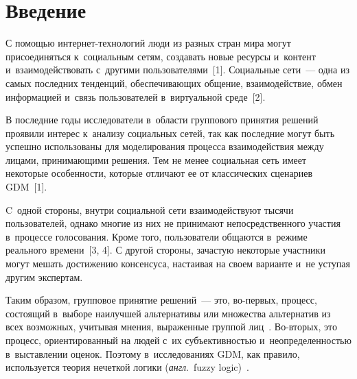 
  
\vspace*{2pt}



\thispagestyle{headings}

\begin{multicols}{2}

\label{st\stat}

\section{Введение}

  С помощью интернет-технологий люди из разных стран мира могут 
присоединяться к~социальным сетям, создавать новые ресурсы и~контент\linebreak 
и~взаимодействовать с~другими пользователями~[1]. Социальные сети~--- одна 
из самых последних тенденций, обеспечивающих общение, взаимодействие, 
обмен информацией и~связь пользователей в~виртуальной среде~[2]. 
  
  В последние годы исследователи в~области группового принятия решений 
 проявили интерес к~анализу социальных 
сетей, так как последние могут быть успешно использованы для моделирования 
процесса взаимодействия между лицами, принимающими решения. Тем не 
менее социальная сеть имеет некоторые особенности, которые отличают ее от 
классических сценариев GDM~[1].

 C~одной стороны, внутри социальной сети 
взаимодействуют тысячи пользователей, однако многие из них не принимают 
непосредственного участия в~процессе голосования. Кроме того, пользователи 
общаются в~режиме реального времени~[3, 4]. С другой стороны, зачастую 
некоторые участники могут мешать достижению консенсуса, настаивая на 
своем варианте и~не уступая другим экспертам. 

Таким образом, групповое 
принятие решений~--- это, во-пер\-вых, процесс, состоящий в~выборе 
наилучшей альтернативы или множества альтернатив из всех возможных, 
учитывая мнения, выраженные группой лиц~\cite{3-gai, 5-gai}. Во-вто\-рых, это 
процесс, ориентированный на людей с~их субъективностью 
и~неопределенностью в~выставлении оценок. Поэтому в~исследованиях GDM, 
как правило, используется теория нечеткой логики (\textit{англ}.\ fuzzy  
logic)~\cite{6-gai, 7-gai, 8-gai}.
  

\end{multicols}

